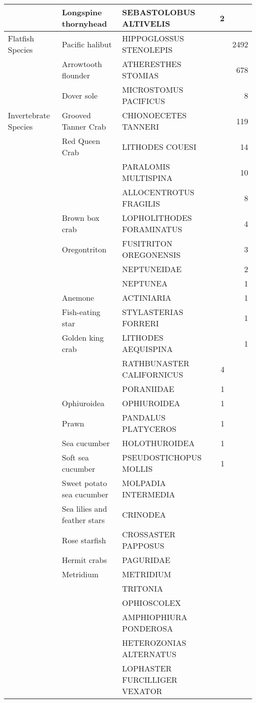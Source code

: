 \documentclass[12pt]{article}\usepackage[]{graphicx}\usepackage[]{color}
\begin{document}
\begin{table}
\begin{tabular}[t]{lllrr}
 & Longspine thornyhead & SEBASTOLOBUS ALTIVELIS & 2 & \\
\hline
Flatfish Species & Pacific halibut & HIPPOGLOSSUS STENOLEPIS &  & 2492\\
 & Arrowtooth flounder & ATHERESTHES STOMIAS &  & 678\\
 & Dover sole & MICROSTOMUS PACIFICUS &  & 8\\
\hline
Invertebrate Species & Grooved Tanner Crab & CHIONOECETES TANNERI &  & 119\\
 & Red Queen Crab & LITHODES COUESI &  & 14\\
 &  & PARALOMIS MULTISPINA &  & 10\\
 &  & ALLOCENTROTUS FRAGILIS &  & 8\\
 & Brown box crab & LOPHOLITHODES FORAMINATUS &  & 4\\
 & Oregontriton & FUSITRITON OREGONENSIS &  & 3\\
 &  & NEPTUNEIDAE &  & 2\\
 &  & NEPTUNEA &  & 1\\
 & Anemone & ACTINIARIA &  & 1\\
 & Fish-eating star & STYLASTERIAS FORRERI &  & 1\\
 & Golden king crab & LITHODES AEQUISPINA &  & 1\\
 &  & RATHBUNASTER CALIFORNICUS & 4 & \\
 &  & PORANIIDAE & 1 & \\
 & Ophiuroidea & OPHIUROIDEA & 1 & \\
 & Prawn & PANDALUS PLATYCEROS & 1 & \\
 & Sea cucumber & HOLOTHUROIDEA & 1 & \\
 & Soft sea cucumber & PSEUDOSTICHOPUS MOLLIS & 1 & \\
 & Sweet potato sea cucumber & MOLPADIA INTERMEDIA &  & \\
 & Sea lilies and feather stars & CRINODEA &  & \\
 & Rose starfish & CROSSASTER PAPPOSUS &  & \\
 & Hermit crabs & PAGURIDAE &  & \\
 & Metridium & METRIDIUM &  & \\
 &  & TRITONIA &  & \\
 &  & OPHIOSCOLEX &  & \\
 &  & AMPHIOPHIURA PONDEROSA &  & \\
 &  & HETEROZONIAS ALTERNATUS &  & \\
 &  & LOPHASTER FURCILLIGER VEXATOR &  & \\
\bottomrule
\end{tabular}
\end{table}
\end{document}
